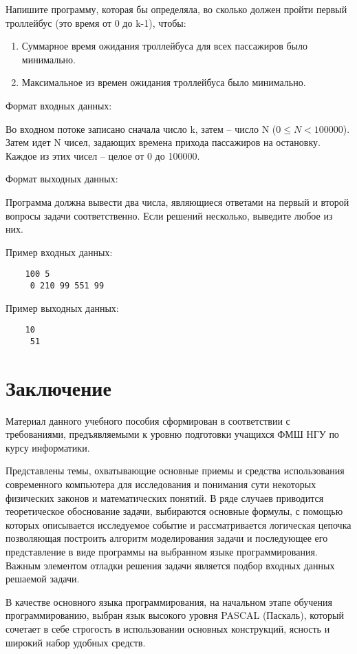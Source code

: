 Напишите программу, которая бы определяла, во сколько должен пройти первый троллейбус (это время от 0 до k-1), чтобы:
\begin{enumerate}
  \item  Суммарное время ожидания троллейбуса для всех пассажиров было минимально.
  \item  Максимальное из времен ожидания троллейбуса было минимально.
\end{enumerate}

Формат входных данных:

Во входном потоке записано сначала число k, затем – число N ($0 \le N < 100000$). Затем идет N чисел, задающих времена прихода пассажиров на остановку. Каждое из этих чисел – целое от 0 до 100000.

Формат выходных данных:

Программа должна вывести два числа, являющиеся ответами на первый и второй вопросы задачи соответственно. Если решений несколько, выведите любое из них.

Пример входных данных:
\begin{verbatim}
    100 5
     0 210 99 551 99
\end{verbatim}

Пример выходных данных:
\begin{verbatim}
    10
     51
\end{verbatim}



\section{Заключение}

Материал данного учебного пособия сформирован в соответствии с требованиями, предъявляемыми к уровню подготовки учащихся ФМШ НГУ по курсу информатики. 

Представлены темы, охватывающие основные приемы и средства использования современного компьютера для исследования и понимания сути некоторых физических законов и математических понятий. 
В ряде случаев приводится теоретическое обоснование задачи, выбираются основные формулы, с помощью которых описывается исследуемое событие и рассматривается логическая цепочка позволяющая 
построить алгоритм моделирования задачи и последующее его представление в виде программы на выбранном языке программирования. Важным элементом отладки решения задачи является подбор входных 
данных решаемой задачи.

В качестве основного языка программирования, на начальном этапе обучения  программированию,  выбран  язык высокого уровня PASCAL (Паскаль), который сочетает в   себе строгость 
в использовании основных конструкций, ясность и широкий набор удобных средств.

